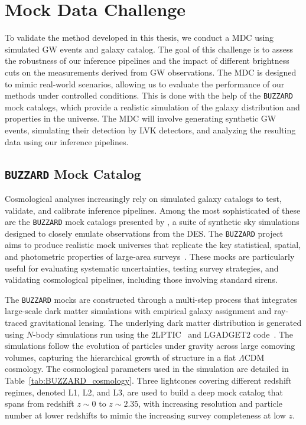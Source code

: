 \chapter{Mock Data Challenge}
\label{chap:MDC}

To validate the method developed in this thesis, we conduct a \acf{MDC} using simulated \ac{GW} events and galaxy catalog. The goal of this challenge is to assess the robustness of our inference pipelines and the impact of different brightness cuts on the measurements derived from \ac{GW} observations. The \ac{MDC} is designed to mimic real-world scenarios, allowing us to evaluate the performance of our methods under controlled conditions. This is done with the help of the \texttt{BUZZARD} mock catalogs, which provide a realistic simulation of the galaxy distribution and properties in the universe. The \ac{MDC} will involve generating synthetic \ac{GW} events, simulating their detection by \ac{LVK} detectors, and analyzing the resulting data using our inference pipelines.

\section{\texttt{BUZZARD} Mock Catalog}
Cosmological analyses increasingly rely on simulated galaxy catalogs to test, validate, and calibrate inference pipelines. Among the most sophisticated of these are the \texttt{BUZZARD} mock catalogs presented by \citet{DES:2019jmj}, a suite of synthetic sky simulations designed to closely emulate observations from the \acf{DES}. The \texttt{BUZZARD} project aims to produce realistic mock universes that replicate the key statistical, spatial, and photometric properties of large-area surveys~\citep{DES:2019jmj,DES:2021bwg}. These mocks are particularly useful for evaluating systematic uncertainties, testing survey strategies, and validating cosmological pipelines, including those involving standard sirens.

The \texttt{BUZZARD} mocks are constructed through a multi-step process that integrates large-scale dark matter simulations with empirical galaxy assignment and ray-traced gravitational lensing. The underlying dark matter distribution is generated using $N$-body simulations run using the 2LPT\small{IC}~\citep{crocce2006transients} and LGADGET2 code~\citep{springel2005cosmological}. The simulations follow the evolution of particles under gravity across large comoving volumes, capturing the hierarchical growth of structure in a flat $\Lambda$CDM cosmology. The cosmological parameters used in the simulation are detailed in Table~\ref{tab:BUZZARD_cosmology}. Three lightcones covering different redshift regimes, denoted L1, L2, and L3, are used to build a deep mock catalog that spans from redshift $z \sim 0$ to $z \sim 2.35$, with increasing resolution and particle number at lower redshifts to mimic the increasing survey completeness at low $z$.

